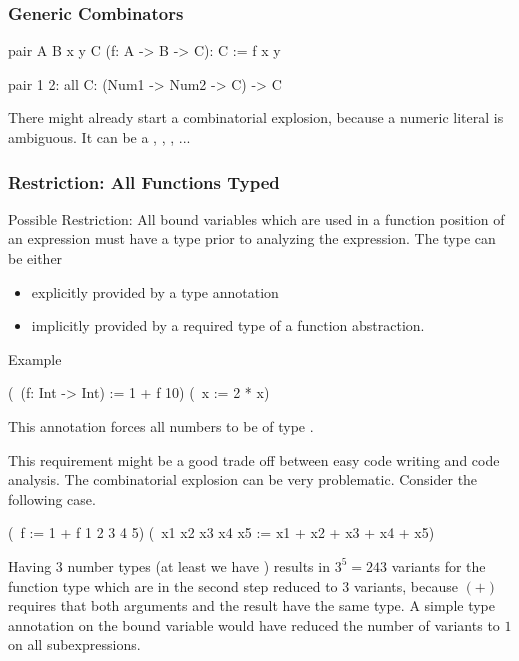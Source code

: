 \vskip 5mm
\subsubsection{Generic Combinators}



\begin{alba}
    pair A B x y C (f: A -> B -> C): C :=
        f x y

    pair 1 2: all C: (Num1 -> Num2 -> C) -> C
\end{alba}

There might already start a combinatorial explosion, because a numeric literal
is ambiguous. It can be a , , ,
 ...




\vskip 5mm
\subsubsection{Restriction: All Functions Typed}

Possible Restriction: All bound variables which are used in a function position
of an expression must have a type prior to analyzing the expression. The type
can be either

\begin{itemize}
\item explicitly provided by a type annotation

\item implicitly provided by a required type of a function abstraction.
\end{itemize}

Example

\begin{alba}
    (\ (f: Int -> Int) := 1 + f 10) (\ x := 2 * x)
\end{alba}

This annotation forces all numbers to be of type .

This requirement might be a good trade off between easy code writing and code
analysis. The combinatorial explosion can be very problematic. Consider the
following case.

\begin{alba}
    (\ f := 1 + f 1 2 3 4 5) (\ x1 x2 x3 x4 x5 := x1 + x2 + x3 + x4 + x5)
\end{alba}

Having 3 number types (at least we have ) results in
$3^5 = 243$ variants for the function type which are in the second step reduced
to $3$ variants, because $(+)$ requires that both arguments and the result have
the same type. A simple type annotation on the bound variable  would
have reduced the number of variants to $1$ on all subexpressions.







